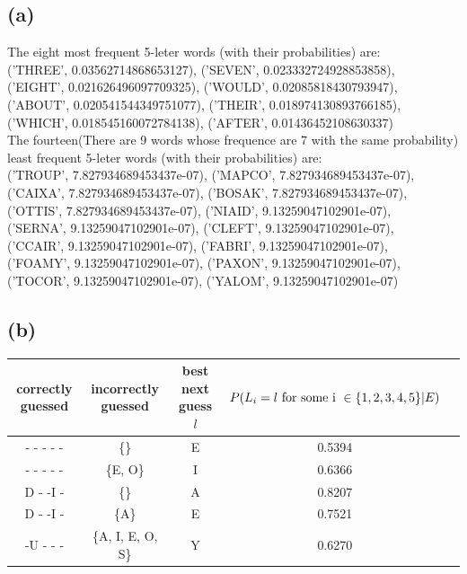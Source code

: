 \documentclass [11pt, a4paper, oneside] {article}
\begin{document}
\subsection *{(a)}
The eight most frequent 5-leter words (with their probabilities) are:\\
('THREE', 0.03562714868653127), ('SEVEN', 0.023332724928853858), \\('EIGHT', 0.021626496097709325), ('WOULD', 0.02085818430793947), \\('ABOUT', 0.020541544349751077), ('THEIR', 0.018974130893766185), \\('WHICH', 0.018545160072784138), ('AFTER', 0.01436452108630337) \\
The fourteen(There are 9 words whose frequence are 7 with the same probability) least frequent 5-leter words (with their probabilities) are:\\
('TROUP', 7.827934689453437e-07), ('MAPCO', 7.827934689453437e-07), \\('CAIXA', 7.827934689453437e-07), ('BOSAK', 7.827934689453437e-07), \\('OTTIS', 7.827934689453437e-07), ('NIAID', 9.13259047102901e-07), \\('SERNA', 9.13259047102901e-07), ('CLEFT', 9.13259047102901e-07),\\ ('CCAIR', 9.13259047102901e-07), ('FABRI', 9.13259047102901e-07), \\('FOAMY', 9.13259047102901e-07), ('PAXON', 9.13259047102901e-07), \\('TOCOR', 9.13259047102901e-07),
('YALOM', 9.13259047102901e-07)
\subsection *{(b)}
\begin{table}[!hbp]
\begin{tabular}{|c|c|c|c|c|}
\hline
correctly guessed & incorrectly guessed & best next guess $l$ & $P(L_i = l \textrm{ for some i }\in \textrm\{1, 2, 3, 4, 5\textrm\}|E)$\\
\hline
- - - - - & \{\} & E & 0.5394\\
\hline
- - - - - & \{E, O\} & I & 0.6366\\
\hline
D - -I - & \{\} & A & 0.8207\\
\hline
D - -I - & \{A\} & E & 0.7521\\
\hline
-U - - - & \{A, I, E, O, S\} & Y & 0.6270\\
\hline
\end{tabular}
\end{table}
\end{document}
